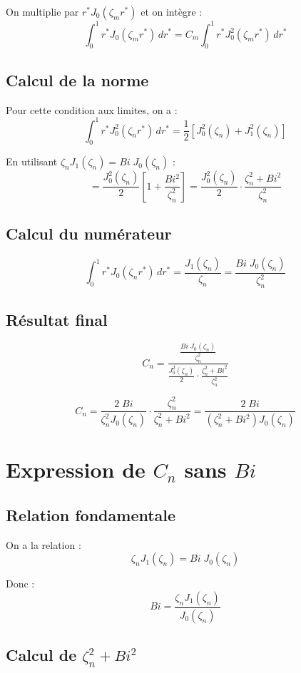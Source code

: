 \documentclass[a4paper,11pt]{article}
\begin{document}
On multiplie par $r^* J_0(\zeta_m r^*)$ et on intègre :
\[
\int_0^1 r^* J_0(\zeta_m r^*) \, dr^* = C_m \int_0^1 r^* J_0^2(\zeta_m r^*) \, dr^*
\]

\subsection*{Calcul de la norme}

Pour cette condition aux limites, on a :
\[
\int_0^1 r^* J_0^2(\zeta_n r^*) \, dr^* = \frac{1}{2}\left[J_0^2(\zeta_n) + J_1^2(\zeta_n)\right]
\]

En utilisant $\zeta_n J_1(\zeta_n) = Bi \; J_0(\zeta_n)$ :
\[
= \frac{J_0^2(\zeta_n)}{2}\left[1 + \frac{Bi^2}{\zeta_n^2}\right] = \frac{J_0^2(\zeta_n)}{2} \cdot \frac{\zeta_n^2 + Bi^2}{\zeta_n^2}
\]

\subsection*{Calcul du numérateur}

\[
\int_0^1 r^* J_0(\zeta_n r^*) \, dr^* = \frac{J_1(\zeta_n)}{\zeta_n} = \frac{Bi \; J_0(\zeta_n)}{\zeta_n^2}
\]

\subsection*{Résultat final}

\[
C_n = \frac{\frac{Bi \; J_0(\zeta_n)}{\zeta_n^2}}{\frac{J_0^2(\zeta_n)}{2} \cdot \frac{\zeta_n^2 + Bi^2}{\zeta_n^2}}
\]

\[
\boxed{C_n = \frac{2 \; Bi}{\zeta_n^2 J_0(\zeta_n)} \cdot \frac{\zeta_n^2}{\zeta_n^2 + Bi^2} = \frac{2 \; Bi}{(\zeta_n^2 + Bi^2) J_0(\zeta_n)}}
\]

\section*{Expression de $C_n$ sans $Bi$}

\subsection*{Relation fondamentale}

On a la relation :
\[
\zeta_n J_1(\zeta_n) = Bi \; J_0(\zeta_n)
\]

Donc :
\[
Bi = \frac{\zeta_n J_1(\zeta_n)}{J_0(\zeta_n)}
\]

\subsection*{Calcul de $\zeta_n^2 + Bi^2$}
\end{document}
